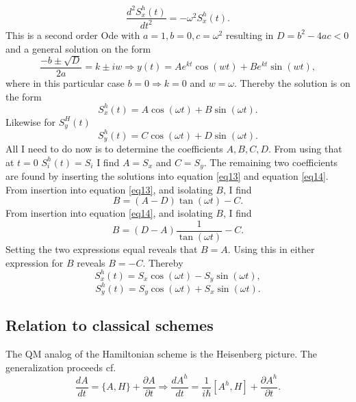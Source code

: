 \begin{example}
\begin{equation}
		\frac{d^2 S_x^h(t)}{dt^2}=-\omega^2S_x^h(t).
	\end{equation} 
	This is a second order Ode with $a=1,b=0,c=\omega^2$ resulting in $D=b^2-4ac<0$ and a general solution on the form
	\begin{equation}
		\frac{-b\pm\sqrt{D}}{2a}=k\pm iw\Rightarrow y(t)=Ae^{kt}\cos(w t)+Be^{kt}\sin(w t),
	\end{equation} 
	where in this particular case $b=0\Rightarrow k=0$ and $w=\omega$. Thereby the solution is on the form
	\begin{equation}
		S_x^h(t)=A\cos(\omega t)+B\sin(\omega t).
	\end{equation} 	
	Likewise for $S_y^H(t)$
	\begin{equation}
		S_y^h(t)=C\cos(\omega t)+D\sin(\omega t).
	\end{equation} 
	All I need to do now is to determine the coefficients $A,B,C,D$. From using that at $t=0$ $S_i^h(t)=S_i$ I find $A=S_x$ and $C=S_y$. The remaining two coefficients are found by inserting the solutions into equation \eqref{eq13} and equation \eqref{eq14}. From insertion into equation \eqref{eq13}, and isolating $B$, I find
	\begin{equation}
		B=(A-D)\tan(\omega t)-C.
	\end{equation} 
	From insertion into equation \eqref{eq14}, and isolating $B$, I find
	\begin{equation}
		B=(D-A)\frac{1}{\tan(\omega t)}-C.
	\end{equation} 
	Setting the two expressions equal reveals that $B=A$. Using this in either expression for $B$ reveals $B=-C$. Thereby
	\begin{equation}
		S_x^h(t)=S_x\cos(\omega t)-S_y\sin(\omega t),
	\end{equation} 
	\begin{equation}
		S_y^h(t)=S_y\cos(\omega t)+S_x\sin(\omega t).
	\end{equation} 
\end{example}

\subsection*{Relation to classical schemes}
The QM analog of the Hamiltonian scheme is the Heisenberg picture. The generalization proceeds cf.
\begin{equation}
	\frac{dA}{dt}=\{A,H\}+\frac{\partial A}{\partial t} \Rightarrow \frac{dA^h}{dt}=\frac{1}{i\hbar}[A^h,H]+\frac{\partial A^h}{\partial t}.
\end{equation} 


